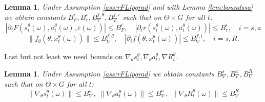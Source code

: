 \documentclass[reqno, 11pt]{amsart}%
\newtheorem{lemma}[theorem]{Lemma}
\theoremstyle{definition}
\begin{document}
\begin{lemma}
    Under  Assumption \ref{ass:rFLipgrad}  and with Lemma \ref{lem:boundssa} we obtain constants $B_F^i, B_r^i,B_\nabla^{f,\theta},B_\nabla^{f,i}  $ such that on $\Theta\times G$ for all $t$:
    \begin{equation}
    |\partial_i F(s^\theta_t(\omega),a^\theta_t(\omega),\varepsilon(\omega))| \le  B_F^i, \quad  |\partial_i r(s^\theta_t(\omega),a^\theta_t(\omega))| \le  B_r^i,\quad i=s,a
\end{equation}
\begin{equation}
    \|f_\theta(\theta,x^\theta_t(\omega))\| \le B_\nabla^{f,\theta},\quad |\partial_i f(\theta,x^\theta_t(\omega))| \le  B_\nabla^{f,i}, \quad i=s,R.
\end{equation}
\end{lemma} 
Last but not least we need bounds on $\nabla_\theta s_t^\theta, \nabla_\theta a_t^\theta, \nabla R_t^\theta. $ 
\begin{lemma}\label{lem:bound1}
    Under  Assumption \ref{ass:rFLipgrad} we obtain constants $B_\nabla^{s}, B_\nabla^a, B_\nabla^R$ such that on $\Theta\times G$ for all $t$:
    \begin{equation}
        \|\nabla_\theta s_t^\theta(\omega)\| \le B_\nabla^{s},\;  \|\nabla_\theta a_t^\theta(\omega)\| \le B_\nabla^a,\;  \|\nabla_\theta R_t^\theta(\omega)\| \le B_\nabla^R
    \end{equation}
\end{lemma} 
\end{document}
